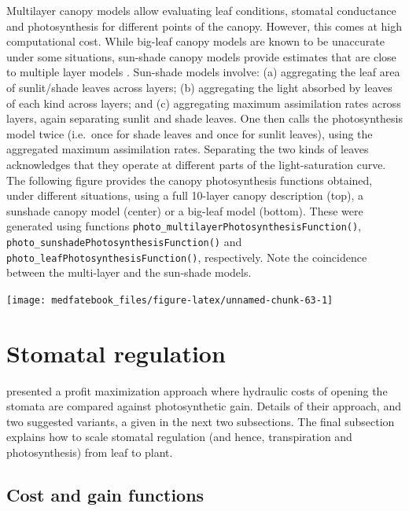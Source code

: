 \documentclass[]{book}
\begin{document}
Multilayer canopy models allow evaluating leaf conditions, stomatal conductance and photosynthesis for different points of the canopy. However, this comes at high computational cost. While big-leaf canopy models are known to be unaccurate under some situations, sun-shade canopy models \citep{DePury1997} provide estimates that are close to multiple layer models \citep{Hikosaka2016}. Sun-shade models involve: (a) aggregating the leaf area of sunlit/shade leaves across layers; (b) aggregating the light absorbed by leaves of each kind across layers; and (c) aggregating maximum assimilation rates across layers, again separating sunlit and shade leaves. One then calls the photosynthesis model twice (i.e.~once for shade leaves and once for sunlit leaves), using the aggregated maximum assimilation rates. Separating the two kinds of leaves acknowledges that they operate at different parts of the light-saturation curve. The following figure provides the canopy photosynthesis functions obtained, under different situations, using a full 10-layer canopy description (top), a sunshade canopy model (center) or a big-leaf model (bottom). These were generated using functions \texttt{photo\_multilayerPhotosynthesisFunction()}, \texttt{photo\_sunshadePhotosynthesisFunction()} and \texttt{photo\_leafPhotosynthesisFunction()}, respectively. Note the coincidence between the multi-layer and the sun-shade models.

\begin{center}\texttt{[image: medfatebook\_files/figure-latex/unnamed-chunk-63-1]} \end{center}

\hypertarget{stomatal-regulation}{%
\section{Stomatal regulation}\label{stomatal-regulation}}

\citet{Sperry2016} presented a profit maximization approach where hydraulic costs of opening the stomata are compared against photosynthetic gain. Details of their approach, and two suggested variants, a given in the next two subsections. The final subsection explains how to scale stomatal regulation (and hence, transpiration and photosynthesis) from leaf to plant.

\hypertarget{cost-and-gain-functions}{%
\subsection{Cost and gain functions}\label{cost-and-gain-functions}}
\end{document}
